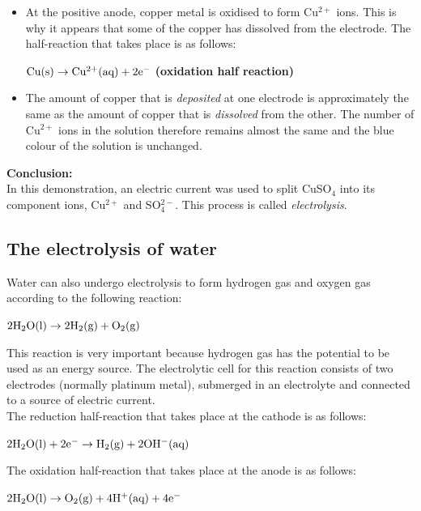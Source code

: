 {\begin{itemize}
\item{At the positive anode, copper metal is oxidised to form Cu$^{2+}$ ions. This is why it appears that some of the copper has dissolved from the electrode. The half-reaction that takes place is as follows:

\begin{center}
$\rm{Cu(s) \rightarrow Cu^{2+}(aq) + 2e^{-}}$ \textbf{(oxidation half reaction)}
\end{center}
}

\item{The amount of copper that is \textit{deposited} at one electrode is approximately the same as the amount of copper that is \textit{dissolved} from the other. The number of Cu$^{2+}$ ions in the solution therefore remains almost the same and the blue colour of the solution is unchanged.}
\end{itemize}

\textbf{Conclusion:}\\

In this demonstration, an electric current was used to split CuSO$_{4}$ into its component ions, Cu$^{2+}$ and SO$_{4}^{2-}$. This process is called \textit{electrolysis}.

}

\subsection{The electrolysis of water}

Water can also undergo electrolysis to form hydrogen gas and oxygen gas according to the following reaction:

\begin{center}
$\rm{2H_{2}O(l) \rightarrow 2H_{2}(g) + O_{2}(g)}$
\end{center}

This reaction is very important because hydrogen gas has the potential to be used as an energy source. The electrolytic cell for this reaction consists of two electrodes (normally platinum metal), submerged in an electrolyte and connected to a source of electric current.\\

The reduction half-reaction that takes place at the cathode is as follows:
\begin{center}
$\rm{2H_{2}O(l) + 2e^{-} \rightarrow H_{2}(g) + 2OH^{-}(aq)}$
\end{center}

The oxidation half-reaction that takes place at the anode is as follows:
\begin{center}
$\rm{2H_{2}O(l) \rightarrow O_{2}(g) + 4H^{+}(aq) + 4e^{-}}$
\end{center}

